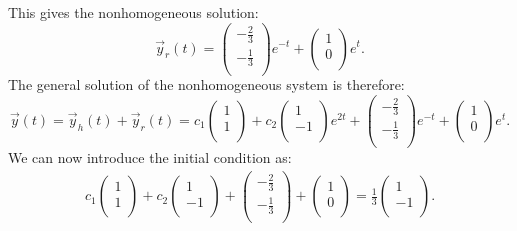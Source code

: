 This gives the nonhomogeneous solution:
\[ 
\Vec{y}_r(t) = \begin{pmatrix}
-\frac{2}{3}\\
-\frac{1}{3}\\
\end{pmatrix} e^{-t} + \begin{pmatrix}
1\\
0\\
\end{pmatrix} e^{t}
.\]
The general solution of the nonhomogeneous system is therefore:
\[ 
\Vec{y}(t) = \Vec{y}_h(t) + \Vec{y}_r(t) = c_1 \begin{pmatrix}
1\\
1\\
\end{pmatrix} + c_2 \begin{pmatrix}
1\\
-1\\
\end{pmatrix} e^{2t} + \begin{pmatrix}
-\frac{2}{3}\\
-\frac{1}{3}\\
\end{pmatrix} e^{-t} + \begin{pmatrix}
1\\
0\\
\end{pmatrix} e^{t}
.\]
We can now introduce the initial condition as:
\begin{align*}
  c_1 \begin{pmatrix}
  1\\
  1\\
  \end{pmatrix} + c_2 \begin{pmatrix}
  1\\
  -1\\
  \end{pmatrix} + \begin{pmatrix}
  -\frac{2}{3}\\
  -\frac{1}{3}\\
  \end{pmatrix} + \begin{pmatrix}
  1\\
  0\\
  \end{pmatrix} = \frac{1}{3} \begin{pmatrix}
  1\\
  -1\\
  \end{pmatrix}
.\end{align*}
